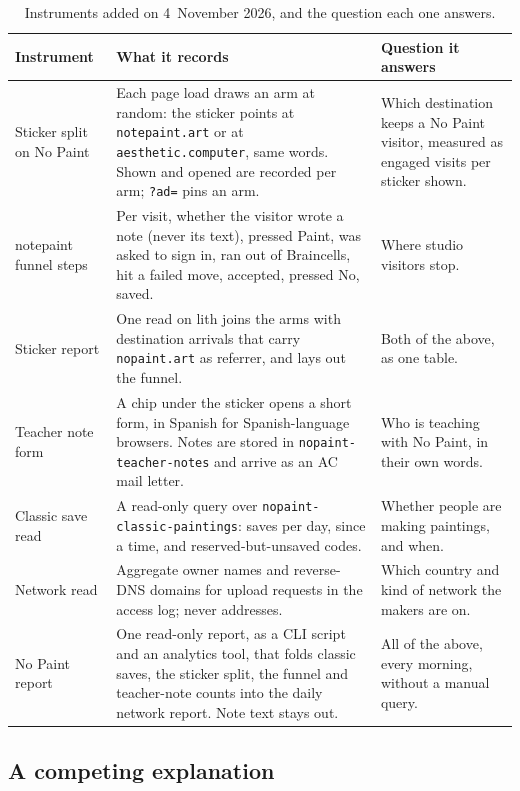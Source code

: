\documentclass[10pt,letterpaper,twocolumn]{article}
\begin{document}
\begin{table}[t]
\centering\small
\caption{Instruments added on 4~November 2026, and the question each one answers.}
\label{tab:features}
\begin{tabularx}{\textwidth}{@{}>{\raggedright\arraybackslash}p{}>{\raggedright\arraybackslash}X>{\raggedright\arraybackslash}p{}@{}}
\toprule
Instrument & What it records & Question it answers \\
\midrule
Sticker split on No Paint & Each page load draws an arm at random: the sticker points at \texttt{notepaint.art} or at \texttt{aesthetic.computer}, same words. Shown and opened are recorded per arm; \texttt{?ad=} pins an arm. & Which destination keeps a No Paint visitor, measured as engaged visits per sticker shown. \\
notepaint funnel steps & Per visit, whether the visitor wrote a note (never its text), pressed Paint, was asked to sign in, ran out of Braincells, hit a failed move, accepted, pressed No, saved. & Where studio visitors stop. \\
Sticker report & One read on lith joins the arms with destination arrivals that carry \texttt{nopaint.art} as referrer, and lays out the funnel. & Both of the above, as one table. \\
Teacher note form & A chip under the sticker opens a short form, in Spanish for Spanish-language browsers. Notes are stored in \texttt{nopaint-teacher-notes} and arrive as an AC mail letter. & Who is teaching with No Paint, in their own words. \\
Classic save read & A read-only query over \texttt{nopaint-classic-paintings}: saves per day, since a time, and reserved-but-unsaved codes. & Whether people are making paintings, and when. \\
Network read & Aggregate owner names and reverse-DNS domains for upload requests in the access log; never addresses. & Which country and kind of network the makers are on. \\
No Paint report & One read-only report, as a CLI script and an analytics tool, that folds classic saves, the sticker split, the funnel and teacher-note counts into the daily network report. Note text stays out. & All of the above, every morning, without a manual query. \\
\bottomrule
\end{tabularx}
\end{table}

\subsection{A competing explanation}
\end{document}
